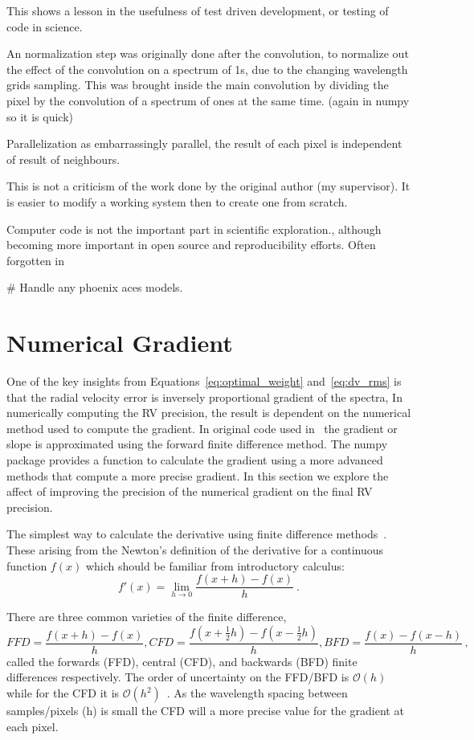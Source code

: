 This shows a lesson in the usefulness of test driven development, or testing of code in science.


An normalization step was originally done after the convolution, to normalize out the effect of the convolution on a spectrum of 1s, due to the changing wavelength grids sampling. This was brought inside the main convolution by dividing the pixel by the convolution of a spectrum of ones at the same time. (again in numpy so it is quick)

Parallelization as embarrassingly parallel, the result of each pixel is independent of result of neighbours.

This is not a criticism of the work done by the original author (my supervisor). It is easier to modify a working system then to create one from scratch.

Computer code is not the important part in scientific exploration., although becoming more important in open source and reproducibility efforts. Often forgotten in

\# Handle any phoenix aces models.


\section{Numerical Gradient}
One of the key insights from Equations~\ref{eq:optimal_weight} and~\ref{eq:dv_rms} is that the radial velocity error is inversely proportional gradient of the spectra, In numerically computing the RV precision, the result is dependent on the numerical method used to compute the gradient.
In original code used in~\citet{figueira_radial_2016} the gradient or slope is approximated using the forward finite difference method. The numpy package provides a function to calculate the gradient using a more advanced methods that compute a more precise gradient. In this section we explore the affect of improving the precision of the numerical gradient on the final RV precision.

The simplest way to calculate the derivative using finite difference methods~\citep{quarteroni_numerical_2000}. These arising from the Newton's definition of the derivative for a continuous function \(f(x)\) which should be familiar from introductory calculus:
\[f'(x) = \lim_{h \to 0} \frac{f(x+h)-f(x)}{h}~.\]

There are three common varieties of the finite difference,
 \[FFD = \frac{f(x+h)-f(x)}{h},  CFD=\frac{f(x+\frac{1}{2}h)-f(x-\frac{1}{2}h)}{h}, BFD=\frac{f(x)-f(x-h)}{h}\,,\] called the forwards (FFD), central (CFD), and backwards (BFD) finite differences respectively. The order of uncertainty on the FFD/BFD is \(\mathcal{O}(h)\) while for the CFD it is \(\mathcal{O}(h^2)\)~\citep{quarteroni_numerical_2000}. As the wavelength spacing between samples/pixels (h) is small the CFD will a more precise value for the gradient at each pixel.


